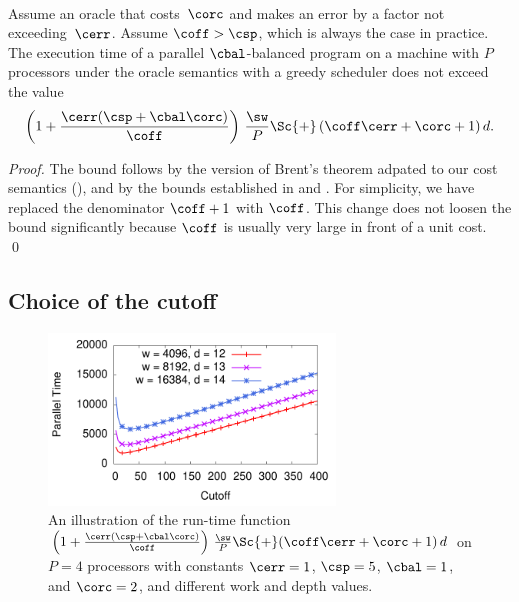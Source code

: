 \begin{theorem}
\label{thm:orc-cost-bound}
\label{thm:orc-time-bound}~\\
Assume an oracle that costs~$\corc$ and makes an error by a factor not
exceeding~$\cerr$. Assume $\coff > \csp$, which is always the case
in practice.
The execution time of a parallel $\cbal$-balanced
program on a machine with $P$ processors under the oracle semantics
with a greedy scheduler does not exceed the value
\[
\left( 1+\frac{\cerr(\csp+\cbal\corc)}{\coff} \right)\,\frac{\sw}{P} \Sc{+} \left( \coff\cerr + \corc + 1\right)d.
\]
\end{theorem}
\begin{proof}
The bound follows by the version of Brent's theorem
adpated to our cost semantics
(), and by the bounds 
established in
 and . 
For simplicity, we have replaced the denominator $\coff+1$
with $\coff$. This change does not loosen the bound significantly
because $\coff$ is usually very large in front of a unit cost.
 \qed
\end{proof}

\subsection{Choice of the cutoff}

\begin{figure}
\includegraphics[width=3in]{pictures/plot-run-time-versus-k-multi}

\caption{An illustration of the run-time function $\left(
  1+\frac{\cerr(\csp+\cbal\corc)}{\coff} \right)\,\frac{\sw}{P} \Sc{+}
  (\coff\cerr+\corc+1)\,d$ on $P = 4$ processors with constants $\cerr =1$,
   $\csp = 5$, $\cbal = 1$, and $\corc = 2$, and different work and
  depth values.}

\label{fig:run-time-versus-kappa}
\end{figure}

